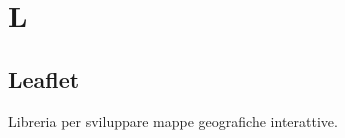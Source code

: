 \section*{L}
\markright{}

\subsection*{Leaflet}
Libreria  per sviluppare mappe geografiche interattive.
